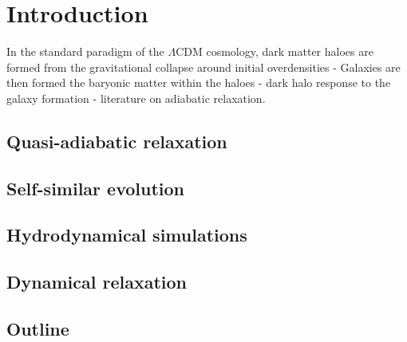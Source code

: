 \chapter{Introduction}
In the standard paradigm of the $\Lambda$CDM cosmology, dark matter haloes are formed from the gravitational collapse around initial overdensities - Galaxies are then formed the baryonic matter within the haloes - dark halo response to the galaxy formation - literature on adiabatic relaxation.


\section{Quasi-adiabatic relaxation}

\section{Self-similar evolution}
\cite{2015LauNagaietal}

\section{Hydrodynamical simulations}

\section{Dynamical relaxation}

\section{Outline}
